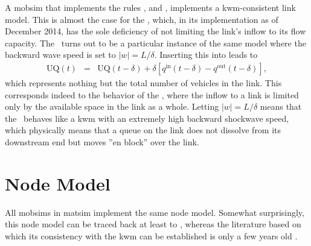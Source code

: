 A \gls{mobsim} that implements the rules , 
and ,  implements a \gls{kwm}-consistent
link model. This is almost the case for the \DOUBLEQUEUESIM,
which, in its implementation as of December 2014, has the sole deficiency
of not limiting the link's inflow to its flow capacity. 
%
The \SINGLEQUEUESIM\ turns out to be a
particular instance of the same model where the backward wave speed
is set to $\left|w\right|=L/\delta$. Inserting this into 
leads to
\begin{eqnarray}
\text{UQ}(t) & = & \text{UQ}(t-\delta)+\delta\left[q^{\text{in}}(t-\delta)-q^{\text{out}}(t-\delta)\right],
\end{eqnarray}
which represents nothing but the total number of vehicles in the link.
This corresponds indeed to the behavior of the \SINGLEQUEUESIM,
where the inflow to a link is limited only by the available space
in the link as a whole. Letting $\left|w\right|=L/\delta$ means that
the \SINGLEQUEUESIM\ behaves like a \gls{kwm} with an extremely
high backward shockwave speed, which physically means that a queue
on the link does not dissolve from its downstream end but moves {}''en
block'' over the link. 

\section{\label{sec:Node-model}Node Model}
All \glspl{mobsim} in \gls{matsim} implement the same node model. Somewhat surprisingly,
this node model can be traced back at least to \cite[][under the name of ``fair intersections'']{CetinBurriNagel2003queue}, whereas
the literature based on which its consistency with the \gls{kwm} can be
established is only a few years old \citep{tampere-2010b,floetteroed-2011a,corthout-2012}. 

